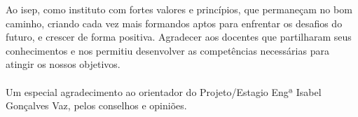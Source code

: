 \begin{acknowledgements}
Ao \ac{isep}, como instituto com fortes valores e princípios, que permaneçam no bom caminho, criando cada vez mais formandos aptos para enfrentar os desafios do futuro, e crescer de forma positiva. Agradecer aos docentes que partilharam seus conhecimentos e nos permitiu desenvolver as competências necessárias para atingir os nossos objetivos. \\
\\
Um especial agradecimento ao orientador do Projeto/Estagio Engª Isabel Gonçalves Vaz, pelos conselhos e opiniões.
\end{acknowledgements}
